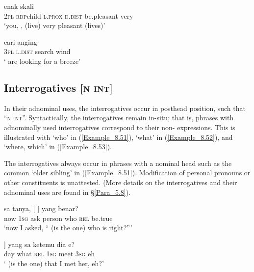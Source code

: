 \ea
\label{Example_8.49}
 {} {} {} {enak} {skali}\\ %
 \textsc{2pl}  \textsc{rdp}{\Tilde}child  \textsc{l.prox}  \textsc{d.dist}  be.pleasant  very\\
\glt 
‘you, \bluebold{)}, (live) very pleasant (lives)’ \textstyleExampleSource{[081115-001b-Cv.0060]}
\z

\ea
\label{Example_8.50}
 {} {cari} {anging}\\ %
 \textsc{3pl}  \textsc{l.dist}  search  wind\\
\glt
‘ are looking for a breeze’ \textstyleExampleSource{[081025-009b-Cv.0076]}
\z


\subsection{Interrogatives [\textsc{n} \textsc{int}]}
\label{Para_8.2.6}
In their adnominal uses, the interrogatives occur in posthead position, such that ``\textsc{n} \textsc{int}''. Syntactically, the interrogatives remain in-situ; that is,  phrases with adnominally used interrogatives correspond to their non- expressions. This is illustrated with  ‘who’ in (\ref{Example_8.51}),  ‘what’ in (\ref{Example_8.52}), and  ‘where, which’ in (\ref{Example_8.53}).



The interrogatives always occur in  phrases with a nominal head such as the common   ‘older sibling’ in (\ref{Example_8.51}). Modification of personal pronouns or other constituents is unattested. (More details on the interrogatives and their adnominal uses are found in §\ref{Para_5.8}).


\ea
\label{Example_8.51}
 {sa} {tanya,} {[} {]} {yang} {benar?}\\ %
 now  \textsc{1sg}  ask  person  who  \textsc{rel}  be.true\\
\glt 
‘now I asked, `` (is the one) who is right?''' \textstyleExampleSource{[080917-010-CvEx.0197]}
\z

\ea
\label{Example_8.52}
\gll {[\bluebold{hari}} {]} {yang} {sa} {ketemu} {dia} {e?}\\ %
 day  what  \textsc{rel}  \textsc{1sg}  meet  \textsc{3sg}  eh\\
\glt 
‘ (is the one) that I met her, eh?’ \textstyleExampleSource{[080922-004-Cv.0013]}
\z

